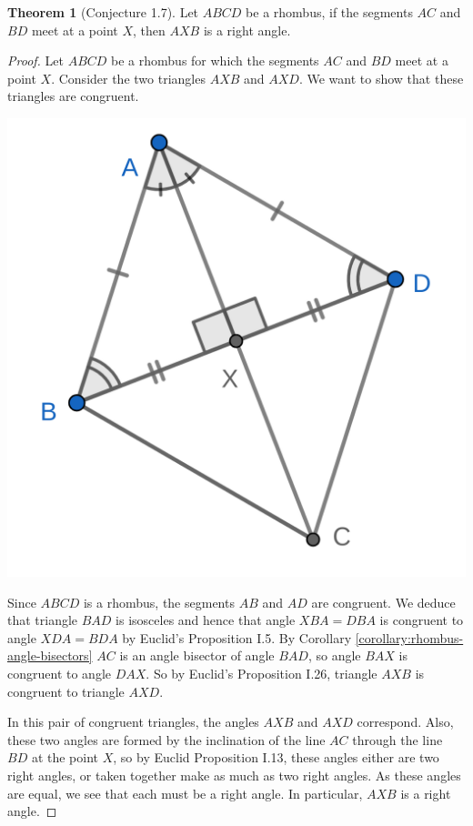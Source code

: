 \documentclass{tufte-handout}
\theoremstyle{definition}
\newtheorem{theorem}{Theorem}[section]
\begin{document}
\begin{theorem}[Conjecture 1.7]\label{theorem:rhombus-diags-perp}
Let $ABCD$ be a rhombus, if the segments $AC$ and $BD$ meet at a point $X$, then $AXB$ is a right angle.
\end{theorem}

\begin{proof}
Let $ABCD$ be a rhombus for which the segments $AC$ and $BD$ meet at a point $X$. Consider the two triangles $AXB$ and $AXD$. We want to show that these triangles are congruent.

\begin{marginfigure}
  \includegraphics{images/rhombus_diags_perp.png}
\end{marginfigure}

Since $ABCD$ is a rhombus, the segments $AB$ and $AD$ are congruent. We deduce that triangle $BAD$ is isosceles and hence that angle $XBA = DBA$ is congruent to angle $XDA = BDA$ by Euclid's Proposition I.5. By Corollary \ref{corollary:rhombus-angle-bisectors} $AC$ is an angle bisector of angle $BAD$, so angle $BAX$ is congruent to angle $DAX$. So by Euclid's Proposition I.26, triangle $AXB$ is congruent to triangle $AXD$.

In this pair of congruent triangles, the angles $AXB$ and $AXD$ correspond. Also, these two angles are formed by the inclination of the line $AC$ through the line $BD$ at the point $X$, so by Euclid Proposition I.13, these angles either are two right angles, or taken together make as much as two right angles. As these angles are equal, we see that each must be a right angle. In particular, $AXB$ is a right angle.
\end{proof}
\end{document}
